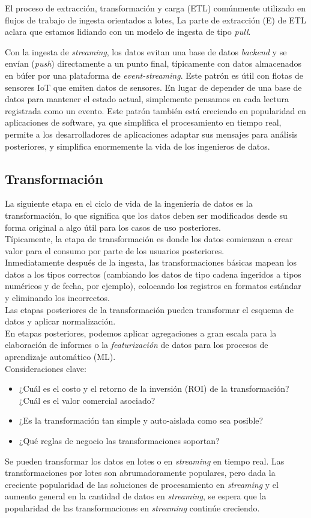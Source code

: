 \documentclass[12pt]{book}
\begin{document}
El proceso de extracción, transformación y carga (ETL) comúnmente utilizado en flujos de trabajo de ingesta orientados a lotes, La parte de extracción (E) de ETL aclara que estamos lidiando con un modelo de ingesta de tipo \textit{pull}.

Con la ingesta de \textit{streaming}, los datos evitan una base de datos \textit{backend} y se envían (\textit{push}) directamente a un punto final, típicamente con datos almacenados en búfer por una plataforma de \textit{event-streaming}. Este patrón es útil con flotas de sensores IoT que emiten datos de sensores. En lugar de depender de una base de datos para mantener el estado actual, simplemente pensamos en cada lectura registrada como un evento.
Este patrón también está creciendo en popularidad en aplicaciones de software, ya que simplifica el procesamiento en tiempo real, permite a los desarrolladores de aplicaciones adaptar sus mensajes para análisis posteriores, y simplifica enormemente la vida de los ingenieros de datos.

\subsection{Transformación}
La siguiente etapa en el ciclo de vida de la ingeniería de datos es la transformación, lo que significa que los datos deben ser modificados desde su forma original a algo útil para los casos de uso posteriores.\\
Típicamente, la etapa de transformación es donde los datos comienzan a crear valor para el consumo por parte de los usuarios posteriores.\\
Inmediatamente después de la ingesta, las transformaciones básicas mapean los datos a los tipos correctos (cambiando los datos de tipo cadena ingeridos a tipos numéricos y de fecha, por ejemplo), colocando los registros en formatos estándar y eliminando los incorrectos.\\
Las etapas posteriores de la transformación pueden transformar el esquema de datos y aplicar normalización. \\
En etapas posteriores, podemos aplicar agregaciones a gran escala para la elaboración de informes o la \textit{featurización} de datos para los procesos de aprendizaje automático (ML).\\

Consideraciones clave:
\begin{itemize}
    \item ¿Cuál es el costo y el retorno de la inversión (ROI) de la transformación? ¿Cuál es el valor comercial asociado?
    \item ¿Es la transformación tan simple y auto-aislada como sea posible?
    \item ¿Qué reglas de negocio las transformaciones soportan?
\end{itemize}
Se pueden transformar los datos en lotes o en \textit{streaming} en tiempo real.
Las transformaciones por lotes son abrumadoramente populares, pero dada la creciente popularidad de las soluciones de procesamiento en \textit{streaming} y el aumento general en la cantidad de datos en \textit{streaming}, se espera que la popularidad de las transformaciones en \textit{streaming} continúe creciendo.
\end{document}
